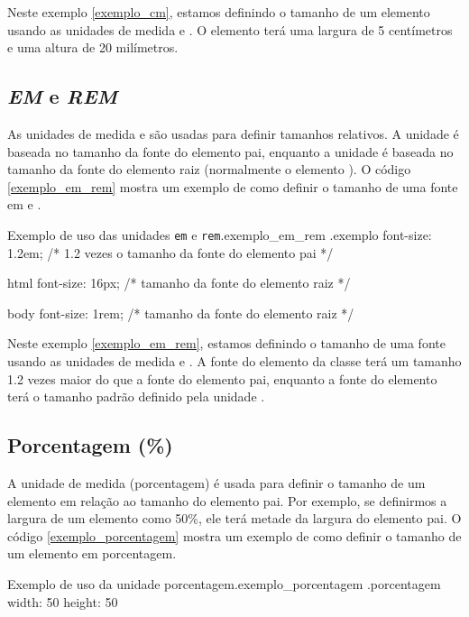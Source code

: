 Neste exemplo \ref{exemplo_cm}, estamos definindo o tamanho de um elemento usando as unidades de medida  e . O elemento terá uma largura de 5 centímetros e uma altura de 20 milímetros.

\subsection{\textit{EM} e \textit{REM}}

As unidades de medida  e  são usadas para definir tamanhos relativos. A unidade  é baseada no tamanho da fonte do elemento pai, enquanto a unidade  é baseada no tamanho da fonte do elemento raiz (normalmente o elemento ). O código \ref{exemplo_em_rem} mostra um exemplo de como definir o tamanho de uma fonte em  e .

\begin{csscode}{Exemplo de uso das unidades \texttt{em} e \texttt{rem}.}{exemplo_em_rem}
.exemplo {
    font-size: 1.2em; /* 1.2 vezes o tamanho da fonte do elemento pai */
}

html {
    font-size: 16px; /* tamanho da fonte do elemento raiz */
}

body {
    font-size: 1rem; /* tamanho da fonte do elemento raiz */
}
\end{csscode}

Neste exemplo \ref{exemplo_em_rem}, estamos definindo o tamanho de uma fonte usando as unidades de medida  e . A fonte do elemento da classe  terá um tamanho 1.2 vezes maior do que a fonte do elemento pai, enquanto a fonte do elemento  terá o tamanho padrão definido pela unidade .

\subsection{Porcentagem (\%)}

A unidade de medida \var{\%} (porcentagem) é usada para definir o tamanho de um elemento em relação ao tamanho do elemento pai. Por exemplo, se definirmos a largura de um elemento como 50\%, ele terá metade da largura do elemento pai. O código \ref{exemplo_porcentagem} mostra um exemplo de como definir o tamanho de um elemento em porcentagem.

\begin{csscode}{Exemplo de uso da unidade porcentagem.}{exemplo_porcentagem}
.porcentagem {
    width: 50%
    height: 50%
}
\end{csscode}

